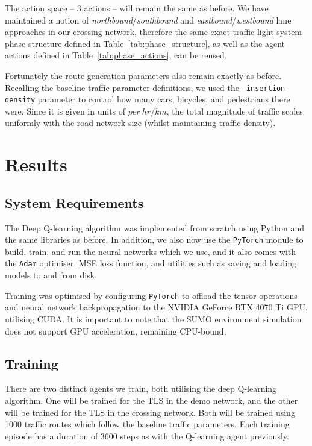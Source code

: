 \documentclass[a4paper]{report}
\begin{document}
The action space -- 3 actions -- will remain the same as before. We have maintained a notion of \emph{northbound}/\emph{southbound} and \emph{eastbound}/\emph{westbound} lane approaches in our crossing network, therefore the same exact traffic light system phase structure defined in Table~\ref{tab:phase_structure}, as well as the agent actions defined in Table~\ref{tab:phase_actions}, can be reused. 

Fortunately the route generation parameters also remain exactly as before. Recalling the baseline traffic parameter definitions, we used the \texttt{--insertion-density} parameter to control how many cars, bicycles, and pedestrians there were. Since it is given in units of $per\ hr/km$, the total magnitude of traffic scales uniformly with the road network size (whilst maintaining traffic density).

\section{Results}

\subsection{System Requirements}

The Deep Q-learning algorithm was implemented from scratch using Python and the same libraries as before. In addition, we also now use the \texttt{PyTorch} module to build, train, and run the neural networks which we use, and it also comes with the \texttt{Adam} optimiser, MSE loss function, and utilities such as saving and loading models to and from disk.

Training was optimised by configuring \texttt{PyTorch} to offload the tensor operations and neural network backpropagation to the NVIDIA GeForce RTX 4070 Ti GPU, utilising CUDA. It is important to note that the SUMO environment simulation does not support GPU acceleration, remaining CPU-bound.

\subsection{Training}

There are two distinct agents we train, both utilising the deep Q-learning algorithm. One will be trained for the TLS in the demo network, and the other will be trained for the TLS in the crossing network. Both will be trained using 1000 traffic routes which follow the baseline traffic parameters. Each training episode has a duration of 3600 steps as with the Q-learning agent previously.
\end{document}
